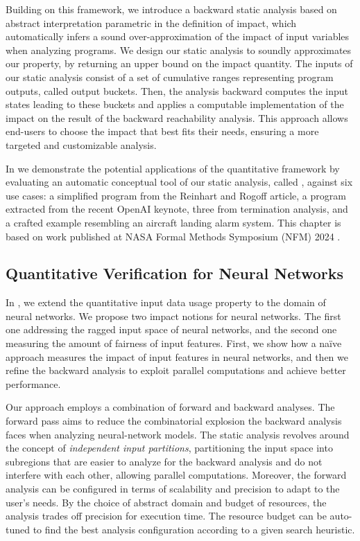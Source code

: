Building on this framework, we introduce a backward static analysis based on abstract interpretation parametric in the definition of impact, which automatically infers a sound over-approximation of the impact of input variables when analyzing programs. We design our static analysis to soundly approximates our property, by returning an upper bound on the impact quantity.
The inputs of our static analysis consist of a set of cumulative ranges representing program outputs, called output buckets.
Then, the analysis backward computes the input states leading to these buckets and applies a computable implementation of the impact on the result of the backward reachability analysis.
This approach allows end-users to choose the impact that best fits their needs, ensuring a more targeted and customizable analysis.

In  we demonstrate the potential applications of the quantitative framework by evaluating an automatic conceptual tool of our static analysis, called \impatto, against six use cases: a simplified program from the Reinhart and Rogoff article, a program extracted from the recent OpenAI keynote, three from termination analysis, and a crafted example resembling an aircraft landing alarm system. This chapter is based on work published at NASA Formal Methods Symposium (NFM) 2024 .


\subsection{Quantitative Verification for Neural Networks}

In , we extend the quantitative input data usage property to the domain of neural networks.
We propose two impact notions for neural networks. The first one addressing the ragged input space of neural networks, and the second one measuring the amount of fairness of input features.
First, we show how a na\"ive approach measures the impact of input features in neural networks, and then we refine the backward analysis to exploit parallel computations and achieve better performance.

Our approach employs a combination of forward and backward analyses.
The forward pass aims to reduce the combinatorial explosion the backward analysis faces when analyzing neural-network models.
The static analysis revolves around the concept of \emph{independent input partitions}, partitioning the input space into subregions that are easier to analyze for the backward analysis and do not interfere with each other, allowing parallel computations.
Moreover, the forward analysis can be configured in terms of scalability and precision to adapt to the user's needs. By the choice of abstract domain and budget of resources, the analysis trades off precision for execution time.
The resource budget can be auto-tuned to find the best analysis configuration according to a given search heuristic.

